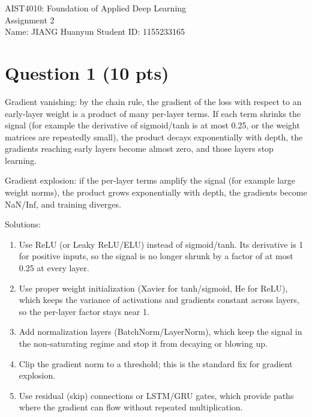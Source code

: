 \documentclass[11pt,a4paper]{article}
\begin{document}
\begin{center}
{\large AIST4010: Foundation of Applied Deep Learning}\\[3pt]
{\large Assignment 2}\\[10pt]
Name: JIANG Huanyun \qquad Student ID: 1155233165
\end{center}

\section*{Question 1 (10 pts)}

Gradient vanishing: by the chain rule, the gradient of the loss with
respect to an early-layer weight is a product of many per-layer terms. If
each term shrinks the signal (for example the derivative of
sigmoid/tanh is at most 0.25, or the weight matrices are repeatedly
small), the product decays exponentially with depth, the gradients
reaching early layers become almost zero, and those layers stop learning.

Gradient explosion: if the per-layer terms amplify the signal (for
example large weight norms), the product grows exponentially with depth,
the gradients become NaN/Inf, and training diverges.

Solutions:

\begin{enumerate}
    \item Use ReLU (or Leaky ReLU/ELU) instead of sigmoid/tanh. Its
    derivative is 1 for positive inputs, so the signal is no longer
    shrunk by a factor of at most 0.25 at every layer.

    \item Use proper weight initialization (Xavier for tanh/sigmoid, He
    for ReLU), which keeps the variance of activations and gradients
    constant across layers, so the per-layer factor stays near 1.

    \item Add normalization layers (BatchNorm/LayerNorm), which keep the
    signal in the non-saturating regime and stop it from decaying or
    blowing up.

    \item Clip the gradient norm to a threshold; this is the standard
    fix for gradient explosion.

    \item Use residual (skip) connections or LSTM/GRU gates, which
    provide paths where the gradient can flow without repeated
    multiplication.
\end{enumerate}
\end{document}
